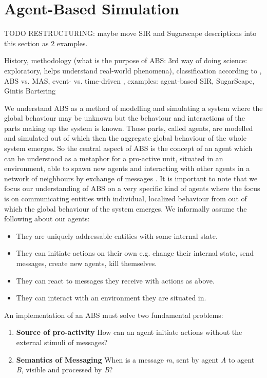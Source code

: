 \section{Agent-Based Simulation}
\label{sec:method_abs}

TODO RESTRUCTURING: maybe move SIR and Sugarscape descriptions into this section as 2 examples.

History, methodology (what is the purpose of ABS: 3rd way of doing science: exploratory, helps understand real-world phenomena), classification according to \cite{macal_everything_2016}, ABS vs. MAS, event- vs. time-driven \cite{meyer_event-driven_2014}, examples: agent-based SIR, SugarScape, Gintis Bartering

We understand ABS as a method of modelling and simulating a system where the global behaviour may be unknown but the behaviour and interactions of the parts making up the system is known. Those parts, called agents, are modelled and simulated out of which then the aggregate global behaviour of the whole system emerges. So the central aspect of ABS is the concept of an agent which can be understood as a metaphor for a pro-active unit, situated in an environment, able to spawn new agents and interacting with other agents in a network of neighbours by exchange of messages \cite{wooldridge_introduction_2009}. It is important to note that we focus our understanding of ABS on a very specific kind of agents where the focus is on communicating entities with individual, localized behaviour from out of which the global behaviour of the system emerges. We informally assume the following about our agents:

\begin{itemize}
	\item They are uniquely addressable entities with some internal state.
	\item They can initiate actions on their own e.g. change their internal state, send messages, create new agents, kill themselves.
	\item They can react to messages they receive with actions as above.
	\item They can interact with an environment they are situated in.
\end{itemize} 

An implementation of an ABS must solve two fundamental problems:

\begin{enumerate}
	\item \textbf{Source of pro-activity} How can an agent initiate actions without the external stimuli of messages?
	\item \textbf{Semantics of Messaging} When is a message \textit{m}, sent by agent \textit{A} to agent \textit{B}, visible and processed by \textit{B}?
\end{enumerate}

